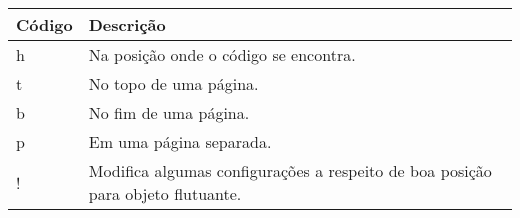 % 
% 
% 
% 
% 
\begin{tabular}{lp{}}
    \hline
    Código & Descrição \\ \hline
    \textsf{h} & Na posição onde o código se encontra. \\
    \textsf{t} & No topo de uma página. \\
    \textsf{b} & No fim de uma página. \\
    \textsf{p} & Em uma página separada. \\
    \textsf{!} & Modifica algumas configurações a respeito de boa posição para objeto flutuante. \\ \hline
\end{tabular}
